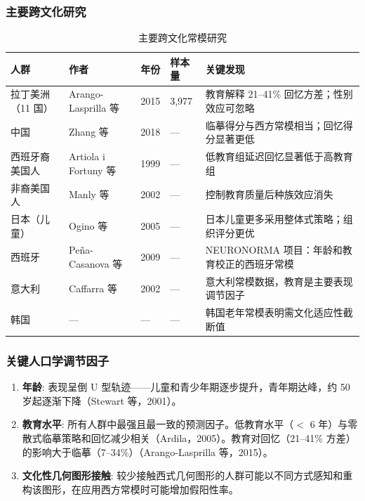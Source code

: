 \documentclass[12pt,a4paper]{ctexart}
\newcommand{\tablefontsize}{\small}
\begin{document}
\subsubsection{主要跨文化研究}

\begin{table}[h!]
\centering
\tablefontsize
\caption{主要跨文化常模研究}
\begin{tabular}{p{2.5cm}p{2.5cm}p{1.2cm}p{1.5cm}p{6cm}}
\toprule
\textbf{人群} & \textbf{作者} & \textbf{年份} & \textbf{样本量} & \textbf{关键发现} \\
\midrule
拉丁美洲（11 国） & Arango-Lasprilla 等 & 2015 & 3,977 & 教育解释 21–41\% 回忆方差；性别效应可忽略 \\
中国 & Zhang 等 & 2018 & — & 临摹得分与西方常模相当；回忆得分显著更低 \\
西班牙裔美国人 & Artiola i Fortuny 等 & 1999 & — & 低教育组延迟回忆显著低于高教育组 \\
非裔美国人 & Manly 等 & 2002 & — & 控制教育质量后种族效应消失 \\
日本（儿童） & Ogino 等 & 2005 & — & 日本儿童更多采用整体式策略；组织评分更优 \\
西班牙 & Peña-Casanova 等 & 2009 & — & NEURONORMA 项目：年龄和教育校正的西班牙常模 \\
意大利 & Caffarra 等 & 2002 & — & 意大利常模数据，教育是主要表现调节因子 \\
韩国 & — & — & — & 韩国老年常模表明需文化适应性截断值 \\
\bottomrule
\end{tabular}
\end{table}

\subsubsection{关键人口学调节因子}

\begin{enumerate}
\item \textbf{年龄}: 表现呈倒 U 型轨迹——儿童和青少年期逐步提升，青年期达峰，约 50 岁起逐渐下降（Stewart 等，2001）。

\item \textbf{教育水平}: 所有人群中最强且最一致的预测因子。低教育水平（$<$ 6 年）与零散式临摹策略和回忆减少相关（Ardila，2005）。教育对回忆（21–41\% 方差）的影响大于临摹（7–34\%）（Arango-Lasprilla 等，2015）。

\item \textbf{文化性几何图形接触}: 较少接触西式几何图形的人群可能以不同方式感知和重构该图形，在应用西方常模时可能增加假阳性率。
\end{enumerate}
\end{document}
